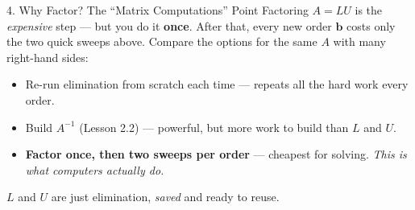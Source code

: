 \documentclass[10pt]{article}
\newcommand{\bb}{\mathbf{b}}
\begin{document}
\boxguard
\begin{notesbox}{4. Why Factor? The ``Matrix Computations'' Point}
Factoring $A=LU$ is the \emph{expensive} step --- but you do it \textbf{once}. After that, every new
order $\bb$ costs only the two quick sweeps above. Compare the options for the same $A$ with many
right-hand sides:
\begin{itemize}\setlength{\itemsep}{2pt}
  \item Re-run elimination from scratch each time --- repeats all the hard work every order.
  \item Build $A^{-1}$ (Lesson 2.2) --- powerful, but more work to build than $L$ and $U$.
  \item \textbf{Factor once, then two sweeps per order} --- cheapest for solving. \emph{This is what
        computers actually do.}
\end{itemize}
$L$ and $U$ are just elimination, \emph{saved} and ready to reuse.
\end{notesbox}
\end{document}
